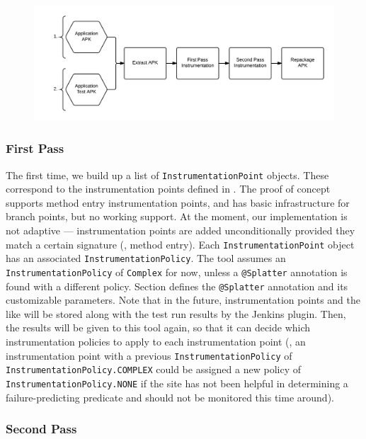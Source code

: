 \begin{figure}[h]
\includegraphics[width=\linewidth]{images/instrumenting_apk}
\caption{}
\label{fig:instrumenting_apk}
\end{figure}

\subsubsection{First Pass}

The first time, we build up a list of {\tt InstrumentationPoint} objects. These correspond to the instrumentation points defined in . The proof of concept supports method entry instrumentation points, and has basic infrastructure for branch points, but no working support. At the moment, our implementation is not adaptive --- instrumentation points are added unconditionally provided they match a certain signature (\eg, method entry). Each {\tt InstrumentationPoint} object has an associated {\tt InstrumentationPolicy}. The tool assumes an {\tt InstrumentationPolicy} of {\tt Complex} for now, unless a {\tt @Splatter} annotation is found with a different policy. Section \todo{[]} defines the {\tt @Splatter} annotation and its customizable parameters. Note that in the future, instrumentation points and the like will be stored along with the test run results by the Jenkins plugin. Then, the results will be given to this tool again, so that it can decide which instrumentation policies to apply to each instrumentation point (\eg, an instrumentation point with a previous {\tt InstrumentationPolicy} of {\tt InstrumentationPolicy.COMPLEX} could be assigned a new policy of {\tt InstrumentationPolicy.NONE} if the site has not been helpful in determining a failure-predicting predicate and should not be monitored this time around).

\subsubsection{Second Pass}

